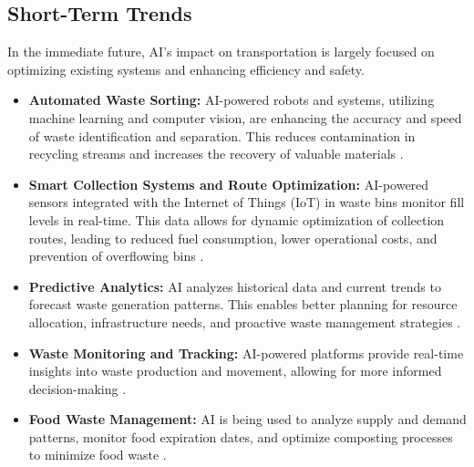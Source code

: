\subsection{Short-Term Trends}
In the immediate future, AI's impact on transportation is largely focused on optimizing existing systems and enhancing efficiency and safety.
\begin{itemize}
    \item \textbf{Automated Waste Sorting:}
AI-powered robots and systems, utilizing machine learning and computer vision, are enhancing the accuracy and speed of waste identification and separation. This reduces contamination in recycling streams and increases the recovery of valuable materials \cite{ITU_FutureTrends, VivaTechnology_FutureTrends}.
    \item \textbf{Smart Collection Systems and Route Optimization:}
AI-powered sensors integrated with the Internet of Things (IoT) in waste bins monitor fill levels in real-time. This data allows for dynamic optimization of collection routes, leading to reduced fuel consumption, lower operational costs, and prevention of overflowing bins \cite{Intangles_FutureTrends, SmartClasses_FutureTrends}.
    \item \textbf{Predictive Analytics:}
AI analyzes historical data and current trends to forecast waste generation patterns. This enables better planning for resource allocation, infrastructure needs, and proactive waste management strategies \cite{Medium_FutureTrends, ArclerProjects_FutureTrends}.
    \item \textbf{Waste Monitoring and Tracking:}
AI-powered platforms provide real-time insights into waste production and movement, allowing for more informed decision-making \cite{EverflowUtilities_FutureTrends}.
    \item \textbf{Food Waste Management:}
AI is being used to analyze supply and demand patterns, monitor food expiration dates, and optimize composting processes to minimize food waste \cite{GlobalTrashSolutions_FutureTrends}.
\end{itemize}

